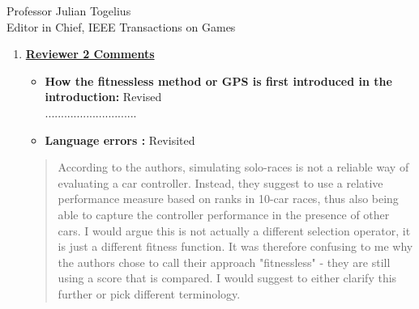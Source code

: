 \documentclass[10pt]{letter} %
\begin{document}
\begin{letter}{Professor Julian Togelius \\ Editor in Chief, IEEE Transactions on Games}
\begin{enumerate}
We have added this text to the paper in order to clarify what we
understand by fitnessless:
{\em Although this selection uses a score that could be assimilated to a fitness, it's actually an extension of a tournament selection policy since it creates tournaments of several individuals, and ``scores'' them according to how they fare in these races. This is not actually a fitness, since it's not intrinsic to the individual. It's equivalent to, in a $n$-tournament selection that is repeated several times, giving a score of $n$ to the first, $n-1$ to the second, and then using this for selection. That score is, thus, not a fitness but actually a way of keeping track of the position of the individual in the different tournaments it's participated.}

\item {\bf \underline{ Reviewer 2 Comments}}\\
	\begin{itemize}
		\item {\bf How the fitnessless method or GPS is first introduced in the introduction:} Revised\\
.............................
		\item {\bf Language errors :} Revisited
                \end{itemize}

                \begin{quote}
                 According to the authors, simulating solo-races is
                 not a reliable way of evaluating a car
                 controller. Instead, they suggest to use a relative
                 performance measure based on ranks in 10-car races,
                 thus also being able to capture the controller
                 performance in the presence of other cars. I would
                 argue this is not actually a different selection
                 operator, it is just a different fitness function. It
                 was therefore confusing to me why the authors chose
                 to call their approach "fitnessless" - they are still
                 using a score that is compared. I would suggest to
                 either clarify this further or pick different
                 terminology.
               \end{quote}


\end{enumerate}
\end{letter}
\end{document}
